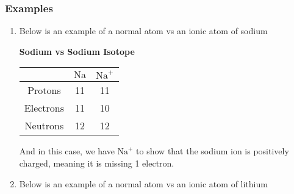 \documentclass[12pt]{report}
\begin{document}
\subsubsection{Examples}
\begin{enumerate}
\setlength\itemsep{0.5em}
    \item{Below is an example of a normal atom vs an ionic atom of sodium
            \begin{table}[h!]
                \renewcommand{\arraystretch}{1.8} %
                \setlength{\tabcolsep}{18pt} %
                \setlength{\arrayrulewidth}{0.25mm}
                \begin{center}
                    \textbf{Sodium vs Sodium Isotope}\\
                    \vspace{0.5em}
                    \begin{tabular}{|c|c|c|}
                    \hline
                      & $\text{Na}$ & $ \text{Na}^{+}$ \\ %
                    \hline
                        Protons & 11 & 11 \\ %
                    \hline
                        Electrons & 11 & 10\\
                    \hline 
                        Neutrons & 12 & 12\\
                    \hline
                    \end{tabular}
                \end{center}
            \end{table}
            
            And in this case, we have $ \text{Na}^{+}$ to show that the sodium ion is positively charged, meaning it is missing 1 electron. 
        }
        \item{Below is an example of a normal atom vs an ionic atom of lithium
                \begin{table}[h!] %

                \renewcommand{\arraystretch}{1.8} %
                \setlength{\tabcolsep}{18pt} %
                \setlength{\arrayrulewidth}{0.25mm}


\end{table}}
\end{enumerate}
\end{document}
